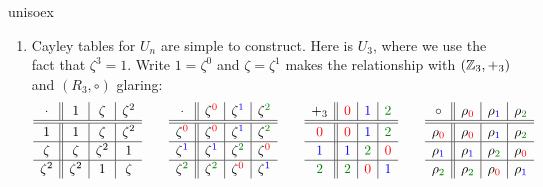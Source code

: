 \begin{examples}{}{unisoex}
\begin{enumerate}
	  
	  \item\label{ex:unisoex2} Cayley tables for $U_n$ are simple to construct. Here is $U_3$, where we use the fact that $\zeta^3=1$. Write $1=\zeta^0$ and $\zeta=\zeta^1$ makes the relationship with $(\mathbb{Z}_3,+_3)$ and $(R_3,\circ)$ glaring:
		\[
			\def\arraystretch{1.1}
			\begin{array}{c||c|c|c}
				\cdot&1&\zeta&\zeta^2\\\hline\hline
				1&1&\zeta&\zeta^2\\\hline
				\zeta&\zeta&\zeta^2&1\\\hline
				\zeta^2&\zeta^2&1&\zeta
			\end{array}
			\qquad
			\begin{array}{c||c|c|c}
				\cdot&\zeta^{\textcolor{red}{0}}&\zeta^{\textcolor{blue}{1}}&\zeta^{\textcolor{Green}{2}}\\\hline\hline
				\zeta^{\textcolor{red}{0}}&\zeta^{\textcolor{red}{0}}&\zeta^{\textcolor{blue}{1}}&\zeta^{\textcolor{Green}{2}}\\\hline
				\zeta^{\textcolor{blue}{1}}&\zeta^{\textcolor{blue}{1}}&\zeta^{\textcolor{Green}{2}}&\zeta^{\textcolor{red}{0}}\\\hline
				\zeta^{\textcolor{Green}{2}}&\zeta^{\textcolor{Green}{2}}&\zeta^{\textcolor{red}{0}}&\zeta^{\textcolor{blue}{1}}
			\end{array}
			\qquad
			\begin{array}{c||c|c|c}
				+_3&\textcolor{red}{0}&\textcolor{blue}{1}&\textcolor{Green}{2}\\\hline\hline
				\textcolor{red}{0}&\textcolor{red}{0}&\textcolor{blue}{1}&\textcolor{Green}{2}\\\hline
				\textcolor{blue}{1}&\textcolor{blue}{1}&\textcolor{Green}{2}&\textcolor{red}{0}\\\hline
				\textcolor{Green}{2}&\textcolor{Green}{2}&\textcolor{red}{0}&\textcolor{blue}{1}
			\end{array}
			\qquad
			\begin{array}{c||c|c|c}
				\circ&\rho_{\textcolor{red}{0}}&\rho_{\textcolor{blue}{1}}&\rho_{\textcolor{Green}{2}}\\\hline\hline
				\rho_{\textcolor{red}{0}}&\rho_{\textcolor{red}{0}}&\rho_{\textcolor{blue}{1}}&\rho_{\textcolor{Green}{2}}\\\hline
				\rho_{\textcolor{blue}{1}}&\rho_{\textcolor{blue}{1}}&\rho_{\textcolor{Green}{2}}&\rho_{\textcolor{red}{0}}\\\hline
				\rho_{\textcolor{Green}{2}}&\rho_{\textcolor{Green}{2}}&\rho_{\textcolor{red}{0}}&\rho_{\textcolor{blue}{1}}

\end{array}\]
\end{enumerate}
\end{examples}
